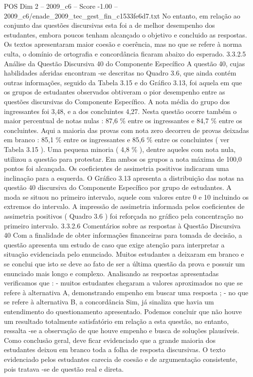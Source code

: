 \begin{textsample}{POS Dim 2 – 2009\_c6 – Score -1.00 – 2009\_c6/enade\_2009\_tec\_gest\_fin\_c1533fe6d7.txt}
No entanto, em relação ao conjunto das questões discursivas esta foi a de melhor desempenho dos estudantes, embora poucos tenham alcançado o objetivo e concluido as respostas.
Os textos apresentaram maior coesão e coerência, mas no que se refere à norma culta, o domínio de ortografia e concordância ficaram abaixo do esperado. 3.3.2.5 Análise da Questão Discursiva 40 do Componente Específico A questão 40, cujas habilidades aferidas encontram -se descritas no Quadro 3.6, que ainda contém outras informações, seguido da Tabela 3.15 e do Gráfico 3.13, foi aquela em que os grupos de estudantes observados obtiveram o pior desempenho entre as questões discursivas do Componente Específico.
A nota média do grupo dos ingressantes foi 3,48, e a dos concluintes 4,27.
Nesta questão ocorre também o maior percentual de notas nulas : 87,6 \% entre os ingressantes e 84,7 \% entre os concluintes.
Aqui a maioria das provas com nota zero decorreu de provas deixadas em branco : 85,1 \% entre os ingressantes e 85,6 \% entre os concluintes ( ver Tabela 3.15 ).
Uma pequena minoria ( 4,8 \% ), dentre aqueles com nota nula, utilizou a questão para protestar.
Em ambos os grupos a nota máxima de 100,0 pontos foi alcançada.
Os coeficientes de assimetria positivos indicaram uma inclinação para a esquerda.
O Gráfico 3.13 apresenta a distribuição das notas na questão 40 discursiva do Componente Específico por grupo de estudantes.
A moda se situou no primeiro intervalo, aquele com valores entre 0 e 10 incluindo os extremos do intervalo.
A impressão de assimetria informada pelos coeficientes de assimetria positivos ( Quadro 3.6 ) foi reforçada no gráfico pela concentração no primeiro intervalo. 3.3.2.6 Comentários sobre as respostas à Questão Discursiva 40 Com a finalidade de obter informações financeiras para tomada de decisão, a questão apresenta um estudo de caso que exige atenção para interpretar a situação evidenciada pelo enunciado.
Muitos estudantes a deixaram em branco e se conclui que isto se deve ao fato de ser a última questão da prova e possuir um enunciado mais longo e complexo.
Analisando as respostas apresentadas verificamos que : - muitos estudantes chegaram a valores aproximados no que se refere à alternativa A, demonstrando empenho em buscar uma resposta ; - no que se refere à alternativa B, a concordância Sim, já sinaliza que havia um entendimento do questionamento apresentado.
Podemos concluir que não houve um resultado totalmente satisfatório em relação a esta questão, no entanto, ressalta -se a observação de que houve empenho e busca de soluções plausíveis.
Como conclusão geral, deve ficar evidenciado que a grande maioria dos estudantes deixou em branco toda a folha de resposta discursivas.
O texto evidenciado pelos estudantes carecia de coesão e de argumentação consistente, pois tratava -se de questão real e direta.

\end{textsample}
